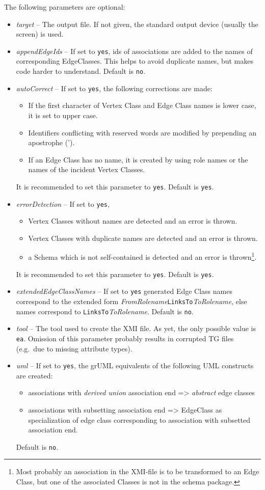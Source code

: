 \documentclass[a4paper]{article}
\begin{document}
	The following parameters are optional:
	\begin{itemize}
		\item \emph{target} -- The output file. If not given, the standard output device (usually the screen) is used.
		\item \emph{appendEdgeIds} -- If set to \texttt{yes}, ids of associations are added to the names of corresponding EdgeClasses. This helps to avoid duplicate names, but makes code harder to understand. Default is \texttt{no}.
		\item \emph{autoCorrect} -- If set to \texttt{yes}, the following corrections are made:
		\begin{itemize}
			\item If the first character of Vertex Class and Edge Class names is lower case, it is set to upper case.
			\item Identifiers conflicting with reserved words are modified by prepending an apostrophe (').
			\item If an Edge Class has no name, it is created by using role names or the names of the incident Vertex Classes. 
		\end{itemize}
		It is recommended to set this parameter to \texttt{yes}. Default is \texttt{yes}.
		\item \emph{errorDetection} -- If set to \texttt{yes},
		\begin{itemize}
			\item Vertex Classes without names are detected and an error is thrown.
			\item Vertex Classes with duplicate names are detected and an error is thrown.
			\item a Schema which is not self-contained is detected and an error is thrown\footnote{Most probably an association in the XMI-file is to be transformed to an Edge Class, but one of the associated Classes is not in the schema package.}.
		\end{itemize}
		It is recommended to set this parameter to \texttt{yes}. Default is \texttt{yes}.
		\item \emph{extendedEdgeClassNames} --  If set to \texttt{yes} generated Edge Class names correspond to the extended form \emph{FromRolename}\texttt{LinksTo}\emph{ToRolename}, else names correspond to \texttt{LinksTo}\emph{ToRolename}. Default is \texttt{no}.
		\item \emph{tool} -- The tool used to create the XMI file. As yet, the only possible value is \texttt{ea}. Omission of this parameter probably results in corrupted TG files (e.g.\ due to missing attribute types).
		\item \emph{uml} -- If set to \texttt{yes}, the grUML equivalents of the following UML constructs are created:
		\begin{itemize}
			\item associations with \emph{derived union} association end => \emph{abstract} edge classes
			\item associations with subsetting association end => EdgeClass as specialization of edge class corresponding to association with subsetted association end.
		\end{itemize}
		Default is \texttt{no}.
	\end{itemize}
	
\end{document}
